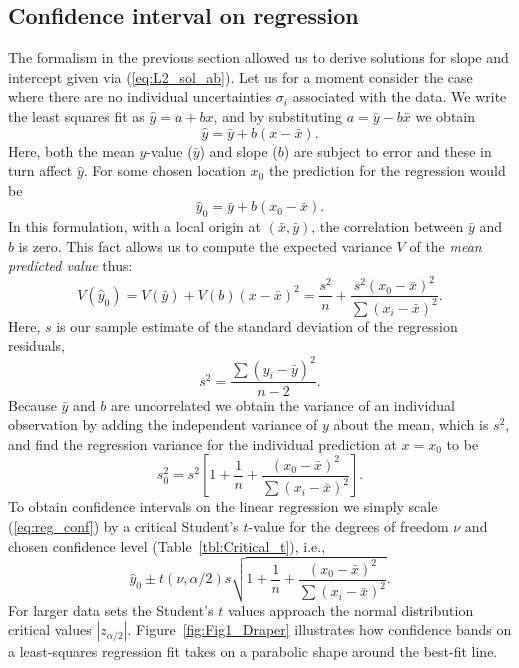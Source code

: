 \subsection{Confidence interval on regression}
The formalism in the previous section allowed us to derive
solutions for slope and intercept given via (\ref{eq:L2_sol_ab}). Let us for a moment consider the case where there
are no individual uncertainties $\sigma_i$ associated with the data.  We write the least squares
fit as $\hat{y} = a + bx$, and by substituting $a = \bar{y} - b\bar{x}$ we obtain
\begin{equation}
	\hat{y} = \bar{y} + b(x-\bar{x}).
\end{equation}
Here, both the mean $y$-value ($\bar{y}$) and slope ($b$) are subject to error and these in turn affect $\hat{y}$.  For some
chosen location $x_0$ the prediction for the regression would be
\begin{equation}
	\hat{y}_0 = \bar{y} + b(x_0-\bar{x}).
\end{equation}
In this formulation, with a local origin at $(\bar{x}, \bar{y})$, the correlation between $\bar{y}$ and $b$ is zero.
This fact allows us to compute the expected variance $V$ of the \emph{mean predicted value} thus:
\begin{equation}
	V(\hat{y}_0) = V(\bar{y}) + V(b)(x-\bar{x})^2 = \frac{s^2}{n} + \frac{s^2(x_0 - \bar{x})^2}{\sum(x_i-\bar{x})^2}.
\end{equation}
Here, $s$ is our sample estimate of the standard deviation of the regression residuals,
\begin{equation}
	s^2 = \frac{\sum (y_i - \bar{y})^2}{n-2}.
	\label{eq:reg_errstd}
\end{equation}
Because $\bar{y}$ and $b$ are uncorrelated we obtain the variance of an individual
observation by adding the independent variance of $y$ about the mean, which is $s^2$, and find the regression
variance for the individual prediction at $x = x_0$ to be
\begin{equation}
s^2_0 = s^2 \left [ 1 + \frac{1}{n} +  \frac{(x_0 - \bar{x})^2}{\sum(x_i-\bar{x})^2} \right ] .
\label{eq:reg_conf}
\end{equation}
To obtain confidence intervals on the linear regression we simply scale (\ref{eq:reg_conf}) by a critical
Student's $t$-value for the degrees of freedom $\nu$ and chosen confidence level (Table~\ref{tbl:Critical_t}), i.e.,
\begin{equation}
	\hat{y}_0 \pm t(\nu,\alpha/2) s \sqrt{ 1 + \frac{1}{n} +  \frac{(x_0 - \bar{x})^2}{\sum(x_i-\bar{x})^2}}.
\end{equation}
For larger data sets the Student's $t$ values approach the normal distribution critical values $|z_{\alpha/2}|$.
Figure~\ref{fig:Fig1_Draper} illustrates how confidence bands on a least-squares regression fit takes
on a parabolic shape around the best-fit line.

